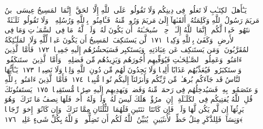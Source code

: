  يَـٰٓأَهلَ ٱلكِتَـٰبِ لَا تَغلُوا۟ فِى دِينِكُم وَلَا تَقُولُوا۟ عَلَى ٱللَّهِ إِلَّا ٱلحَقَّ ۚ إِنَّمَا ٱلمَسِيحُ عِيسَى ٱبنُ مَريَمَ رَسُولُ ٱللَّهِ وَكَلِمَتُهُۥٓ أَلقَىٰهَآ إِلَىٰ مَريَمَ وَرُوحٌۭ مِّنهُ ۖ فَـَٔامِنُوا۟ بِٱللَّهِ وَرُسُلِهِۦ ۖ وَلَا تَقُولُوا۟ ثَلَـٰثَةٌ ۚ ٱنتَهُوا۟ خَيرًۭا لَّكُم ۚ إِنَّمَا ٱللَّهُ إِلَـٰهٌۭ وَٟحِدٌۭ ۖ سُبحَـٰنَهُۥٓ أَن يَكُونَ لَهُۥ وَلَدٌۭ ۘ لَّهُۥ مَا فِى ٱلسَّمَـٰوَٟتِ وَمَا فِى ٱلأَرضِ ۗ وَكَفَىٰ بِٱللَّهِ وَكِيلًۭا ﴿١٧١﴾
 لَّن يَستَنكِفَ ٱلمَسِيحُ أَن يَكُونَ عَبدًۭا لِّلَّهِ وَلَا ٱلمَلَـٰٓئِكَةُ ٱلمُقَرَّبُونَ ۚ وَمَن يَستَنكِف عَن عِبَادَتِهِۦ وَيَستَكبِر فَسَيَحشُرُهُم إِلَيهِ جَمِيعًۭا ﴿١٧٢﴾
 فَأَمَّا ٱلَّذِينَ ءَامَنُوا۟ وَعَمِلُوا۟ ٱلصَّـٰلِحَـٰتِ فَيُوَفِّيهِم أُجُورَهُم وَيَزِيدُهُم مِّن فَضلِهِۦ ۖ وَأَمَّا ٱلَّذِينَ ٱستَنكَفُوا۟ وَٱستَكبَرُوا۟ فَيُعَذِّبُهُم عَذَابًا أَلِيمًۭا وَلَا يَجِدُونَ لَهُم مِّن دُونِ ٱللَّهِ وَلِيًّۭا وَلَا نَصِيرًۭا ﴿١٧٣﴾
 يَـٰٓأَيُّهَا ٱلنَّاسُ قَد جَآءَكُم بُرهَـٰنٌۭ مِّن رَّبِّكُم وَأَنزَلنَآ إِلَيكُم نُورًۭا مُّبِينًۭا ﴿١٧٤﴾
 فَأَمَّا ٱلَّذِينَ ءَامَنُوا۟ بِٱللَّهِ وَٱعتَصَمُوا۟ بِهِۦ فَسَيُدخِلُهُم فِى رَحمَةٍۢ مِّنهُ وَفَضلٍۢ وَيَهدِيهِم إِلَيهِ صِرَٰطًۭا مُّستَقِيمًۭا ﴿١٧٥﴾
 يَستَفتُونَكَ قُلِ ٱللَّهُ يُفتِيكُم فِى ٱلكَلَـٰلَةِ ۚ إِنِ ٱمرُؤٌا۟ هَلَكَ لَيسَ لَهُۥ وَلَدٌۭ وَلَهُۥٓ أُختٌۭ فَلَهَا نِصفُ مَا تَرَكَ ۚ وَهُوَ يَرِثُهَآ إِن لَّم يَكُن لَّهَا وَلَدٌۭ ۚ فَإِن كَانَتَا ٱثنَتَينِ فَلَهُمَا ٱلثُّلُثَانِ مِمَّا تَرَكَ ۚ وَإِن كَانُوٓا۟ إِخوَةًۭ رِّجَالًۭا وَنِسَآءًۭ فَلِلذَّكَرِ مِثلُ حَظِّ ٱلأُنثَيَينِ ۗ يُبَيِّنُ ٱللَّهُ لَكُم أَن تَضِلُّوا۟ ۗ وَٱللَّهُ بِكُلِّ شَىءٍ عَلِيمٌۢ ﴿١٧٦﴾
 


